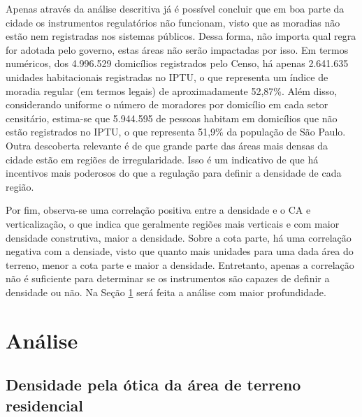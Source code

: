 Apenas através da análise descritiva já é possível concluir que em boa parte da cidade os instrumentos regulatórios não funcionam, visto que as moradias não estão nem registradas nos sistemas públicos. Dessa forma, não importa qual regra for adotada pelo governo, estas áreas não serão impactadas por isso. Em termos numéricos, dos 4.996.529 domicílios registrados pelo Censo, há apenas 2.641.635 unidades habitacionais registradas no IPTU, o que representa um índice de moradia regular (em termos legais) de aproximadamente 52,87\%. Além disso, considerando uniforme o número de moradores por domicílio em cada setor censitário, estima-se que 5.944.595 de pessoas habitam em domicílios que não estão registrados no IPTU, o que representa 51,9\% da população de São Paulo. Outra descoberta relevante é de que grande parte das áreas mais densas da cidade estão em regiões de irregularidade. Isso é um indicativo de que há incentivos mais poderosos do que a regulação para definir a densidade de cada região.

Por fim, observa-se uma correlação positiva entre a densidade e o CA e verticalização, o que indica que geralmente regiões mais verticais e com maior densidade construtiva, maior a densidade. Sobre a cota parte, há uma correlação negativa com a densiade, visto que quanto mais unidades para uma dada área do terreno, menor a cota parte e maior a densidade. Entretanto, apenas a correlação não é suficiente para determinar se os instrumentos são capazes de definir a densidade ou não. Na Seção \ref{sec:analise} será feita a análise com maior profundidade.


\chapter{Análise}
\label{sec:analise}


\section{Densidade pela ótica da área de terreno residencial}
\label{sec:analiseR}

